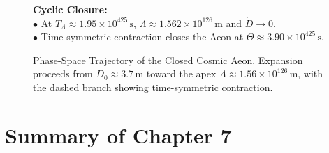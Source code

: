 \documentclass[
    12pt,
    a4paper,
    headings=normal,
    twoside=false,
    open=any,
    parskip=half
]{scrbook}
\begin{document}
\begin{figure}[htbp]
\begin{tcolorbox}[colback=white, colframe=secondarycolor!70, arc=2mm, boxrule=0.7pt, left=6pt, right=6pt, top=4pt, bottom=4pt, width=\linewidth]
\begin{minipage}[t]{0.48\textwidth}
\end{minipage}\hfill
\begin{minipage}[t]{0.48\textwidth}
  \textbf{\color{accentcolor}Cyclic Closure:}\\[1pt]
  $\bullet$ At $T_\Lambda\approx1.95\times10^{425}\,\text{s}$, $\Lambda\approx1.562\times10^{126}\,\text{m}$ and $\dot{D}\to0$.\\[1pt]
  $\bullet$ Time-symmetric contraction closes the Aeon at $\Theta\approx3.90\times10^{425}\,\text{s}$.
\end{minipage}
\end{tcolorbox}
\vspace{-2mm}
\caption{Phase-Space Trajectory of the Closed Cosmic Aeon. Expansion proceeds from $D_0\approx3.7\,\text{m}$ toward the apex $\Lambda\approx1.56\times10^{126}\,\text{m}$, with the dashed branch showing time-symmetric contraction.}
\label{fig:ch7_aeon_velocity_phase_portrait}
\end{figure}

\section{Summary of Chapter 7}
\end{document}
